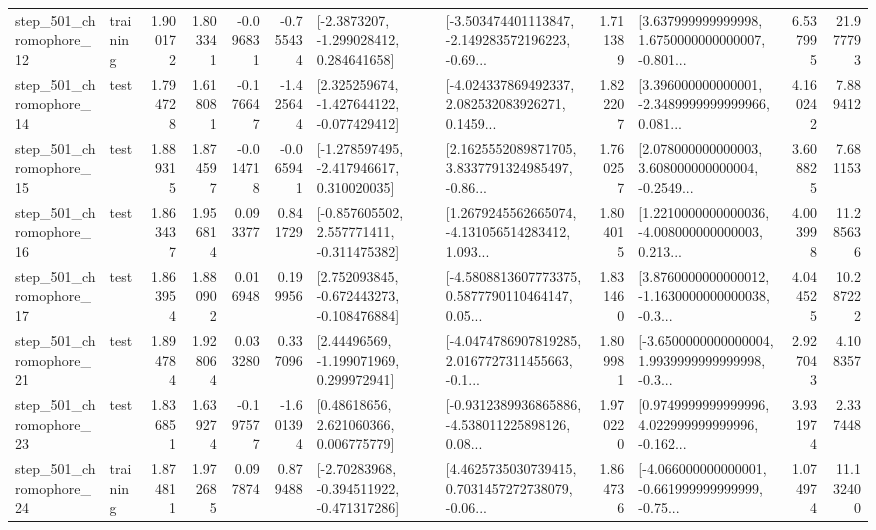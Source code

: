 \begin{tabular}{llrrrrllrlrr}
  step\_501\_chromophore\_12 &  training &      1.900172 &    1.803341 &     -0.096831 & -0.755434 &     [-2.3873207, -1.299028412, 0.284641658] &  [-3.503474401113847, -2.149283572196223, -0.69... &       1.711389 &  [3.637999999999998, 1.6750000000000007, -0.801... &            6.537995 &         21.977793 \\
  step\_501\_chromophore\_14 &      test &      1.794728 &    1.618081 &     -0.176647 & -1.425644 &   [2.325259674, -1.427644122, -0.077429412] &  [-4.024337869492337, 2.082532083926271, 0.1459... &       1.822207 &  [3.396000000000001, -2.3489999999999966, 0.081... &            4.160242 &          7.889412 \\
  step\_501\_chromophore\_15 &      test &      1.889315 &    1.874597 &     -0.014718 & -0.065941 &   [-1.278597495, -2.417946617, 0.310020035] &  [2.1625552089871705, 3.8337791324985497, -0.86... &       1.760257 &  [2.078000000000003, 3.608000000000004, -0.2549... &            3.608825 &          7.681153 \\
  step\_501\_chromophore\_16 &      test &      1.863437 &    1.956814 &      0.093377 &  0.841729 &   [-0.857605502, 2.557771411, -0.311475382] &  [1.2679245562665074, -4.131056514283412, 1.093... &       1.804015 &  [1.2210000000000036, -4.008000000000003, 0.213... &            4.003998 &         11.285636 \\
  step\_501\_chromophore\_17 &      test &      1.863954 &    1.880902 &      0.016948 &  0.199956 &   [2.752093845, -0.672443273, -0.108476884] &  [-4.5808813607773375, 0.5877790110464147, 0.05... &       1.831460 &  [3.8760000000000012, -1.1630000000000038, -0.3... &            4.044525 &         10.287222 \\
  step\_501\_chromophore\_21 &      test &      1.894784 &    1.928064 &      0.033280 &  0.337096 &     [2.44496569, -1.199071969, 0.299972941] &  [-4.0474786907819285, 2.0167727311455663, -0.1... &       1.809981 &  [-3.6500000000000004, 1.9939999999999998, -0.3... &            2.927043 &          4.108357 \\
  step\_501\_chromophore\_23 &      test &      1.836851 &    1.639274 &     -0.197577 & -1.601394 &      [0.48618656, 2.621060366, 0.006775779] &  [-0.9312389936865886, -4.538011225898126, 0.08... &       1.970220 &  [0.9749999999999996, 4.022999999999996, -0.162... &            3.931974 &          2.337448 \\
  step\_501\_chromophore\_24 &  training &      1.874811 &    1.972685 &      0.097874 &  0.879488 &   [-2.70283968, -0.394511922, -0.471317286] &  [4.4625735030739415, 0.7031457272738079, -0.06... &       1.864736 &  [-4.066000000000001, -0.661999999999999, -0.75... &            1.074974 &         11.132400 \\

\end{tabular}
